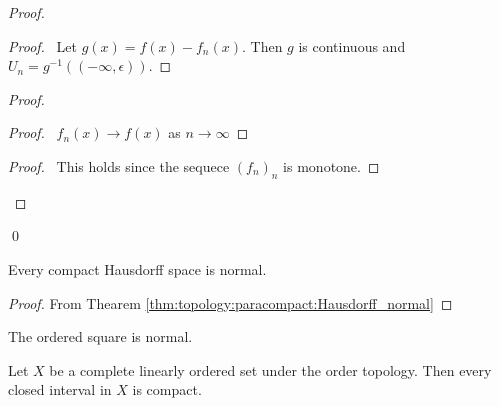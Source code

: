 \begin{proof}
  \pf
  \begin{proof}
    \pf\ Let $g(x) = f(x) - f_n(x)$. Then $g$ is continuous and $U_n =
    g^{-1}((- \infty, \epsilon))$.
  \end{proof}
  \begin{proof}
    \begin{proof}
      \pf\ $f_n(x) \rightarrow f(x)$ as $n \rightarrow \infty$
    \end{proof}
    \begin{proof}
      \pf\ This holds since the sequece $(f_n)_n$ is monotone.
    \end{proof}
  \end{proof}
  \qed
\end{proof}

\begin{lm}
  \label{lm:topology:compact:normal}
  Every compact Hausdorff space is normal.
\end{lm}

\begin{proof}
  \pf
  From Thearem \ref{thm:topology:paracompact:Hausdorff_normal}
\end{proof}

\begin{cor}
 The ordered square is normal.
\end{cor}

\begin{thm}
  \label{thm:topology:compact:closed_interval}
  Let $X$ be a complete linearly ordered set under the order topology. Then
  every closed interval in $X$ is compact.
\end{thm}

